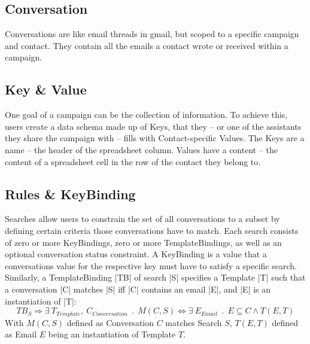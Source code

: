\subsection{Conversation}

Conversations are like email threads in gmail, but scoped to a specific campaign and contact. They contain all the emails a contact wrote or received within a campaign.

\subsection{Key \& Value}


One goal of a campaign can be the collection of information. To achieve this, users create a data schema made up of Keys, that they -- or one of the assistants they share the campaign with -- fills with Contact-specific Values. The Keys are a name – the header of the spreadsheet column. Values have a content – the content of a spreadsheet cell in the row of the contact they belong to.

\subsection{Rules \& KeyBinding}


Searches allow users to constrain the set of all conversations to a subset by defining certain criteria those conversations have to match. Each search consists of zero or more KeyBindings, zero or more TemplateBindings, as well as an optional conversation status constraint. A KeyBinding is a value that a conversations value for the respective key must have to satisfy a specific search. Similarly, a TemplateBinding |TB| of search |S| specifies a Template |T| such that a conversation |C| matches |S| iff |C| contains an email |E|, and |E| is an instantiation of |T|: $$ TB_S \Rightarrow \exists \: T_{Template}, \: C_{Conversation} \: \: . \: \: M(C,S) \Leftrightarrow \exists \: E_{Email} \:\: . \:\: E \subseteq C \land T(E,T) $$  With $M(C,S)$ defined as Conversation $C$ matches Search $S$, $T(E,T)$ defined as Email $E$ being an instantiation of Template $T$.

